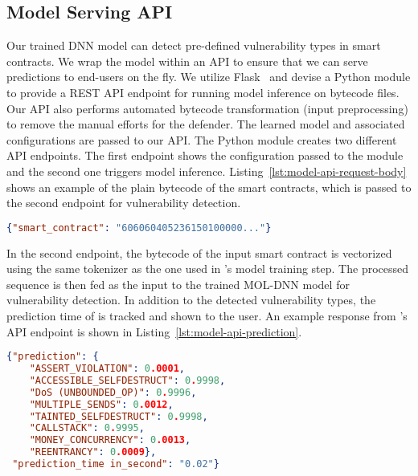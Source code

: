 \subsection{Model Serving API}
\label{sec:implementation:deeplearning:modelapi}
\vspace{-0.2em}
Our trained DNN model can detect pre-defined vulnerability types in smart contracts. We wrap the model within an API to ensure that we can serve predictions to end-users on the fly. We utilize Flask~\cite{flask} and devise a Python module to provide a REST API endpoint for running model inference on bytecode files.  
Our API also performs automated bytecode transformation (input preprocessing) to remove the manual efforts for the defender. 
The learned \sys{} model and associated configurations are passed to our API. 
The Python module creates two different API endpoints. The first endpoint shows the configuration passed to the module and the second one triggers model inference. 
Listing~\ref{lst:model-api-request-body} shows an example of the plain bytecode of the smart contracts, which is passed to the second endpoint for vulnerability detection.  

\vspace{-0.4em}
\begin{lstlisting}[caption={Sample request body when calling \sys{}'s prediction endpoint.},language=json,label={lst:model-api-request-body},firstnumber=1,frame=tblr
,basicstyle=\fontsize{8}{9}\selectfont
]
{"smart_contract": "606060405236150100000..."}
\end{lstlisting}

In the second endpoint, the bytecode of the input smart contract is vectorized using the same tokenizer as the one used in \sys{}'s model training step. The processed sequence is then fed as the input to the trained MOL-DNN model for vulnerability detection. In addition to the detected vulnerability types, the prediction time of \sys{} is tracked and shown to the user. An example response from \sys{}'s API endpoint is shown in Listing~\ref{lst:model-api-prediction}.

\vspace{-0.4em}
\begin{lstlisting}[caption={\sys{}'s response to the sample request when calling our prediction endpoint. The response includes the analysis results of multiple vulnerability types. },label={lst:model-api-prediction},language=json,firstnumber=1,frame=tblr, basicstyle=\fontsize{8}{9}\selectfont]
{"prediction": {
    "ASSERT_VIOLATION": 0.0001,
    "ACCESSIBLE_SELFDESTRUCT": 0.9998,
    "DoS (UNBOUNDED_OP)": 0.9996,
    "MULTIPLE_SENDS": 0.0012,
    "TAINTED_SELFDESTRUCT": 0.9998,
    "CALLSTACK": 0.9995,
    "MONEY_CONCURRENCY": 0.0013,
    "REENTRANCY": 0.0009}, 
 "prediction_time in_second": "0.02"}
\end{lstlisting}\vspace{-0.3em}

